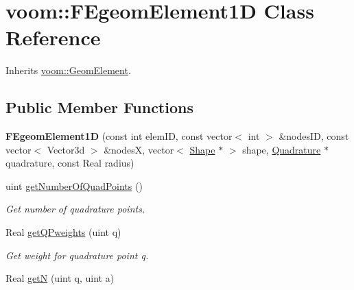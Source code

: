 \hypertarget{classvoom_1_1_f_egeom_element1_d}{
\section{voom::FEgeomElement1D Class Reference}
\label{classvoom_1_1_f_egeom_element1_d}
}


Inherits \hyperlink{classvoom_1_1_geom_element}{voom::GeomElement}.\subsection*{Public Member Functions}
\begin{DoxyCompactItemize}
\item 
\hypertarget{classvoom_1_1_f_egeom_element1_d_a51cd633846a29fd3d8ab5cd67685eda2}{
{\bfseries FEgeomElement1D} (const int elemID, const vector$<$ int $>$ \&nodesID, const vector$<$ Vector3d $>$ \&nodesX, vector$<$ \hyperlink{classvoom_1_1_shape}{Shape} $\ast$ $>$ shape, \hyperlink{classvoom_1_1_quadrature}{Quadrature} $\ast$quadrature, const Real radius)}
\label{classvoom_1_1_f_egeom_element1_d_a51cd633846a29fd3d8ab5cd67685eda2}

\item 
\hypertarget{classvoom_1_1_f_egeom_element1_d_a6db9905bdedc0d744bfbac67bf09f22d}{
uint \hyperlink{classvoom_1_1_f_egeom_element1_d_a6db9905bdedc0d744bfbac67bf09f22d}{getNumberOfQuadPoints} ()}
\label{classvoom_1_1_f_egeom_element1_d_a6db9905bdedc0d744bfbac67bf09f22d}

\begin{DoxyCompactList}\small\item\em Get number of quadrature points. \item\end{DoxyCompactList}\item 
\hypertarget{classvoom_1_1_f_egeom_element1_d_a8efede1d63fbbaaf5859e10bdc08593a}{
Real \hyperlink{classvoom_1_1_f_egeom_element1_d_a8efede1d63fbbaaf5859e10bdc08593a}{getQPweights} (uint q)}
\label{classvoom_1_1_f_egeom_element1_d_a8efede1d63fbbaaf5859e10bdc08593a}

\begin{DoxyCompactList}\small\item\em Get weight for quadrature point q. \item\end{DoxyCompactList}\item 
\hypertarget{classvoom_1_1_f_egeom_element1_d_af62b11d925da96b1d188839382ea3ac2}{
Real \hyperlink{classvoom_1_1_f_egeom_element1_d_af62b11d925da96b1d188839382ea3ac2}{getN} (uint q, uint a)}
\label{classvoom_1_1_f_egeom_element1_d_af62b11d925da96b1d188839382ea3ac2}


\end{DoxyCompactItemize}
